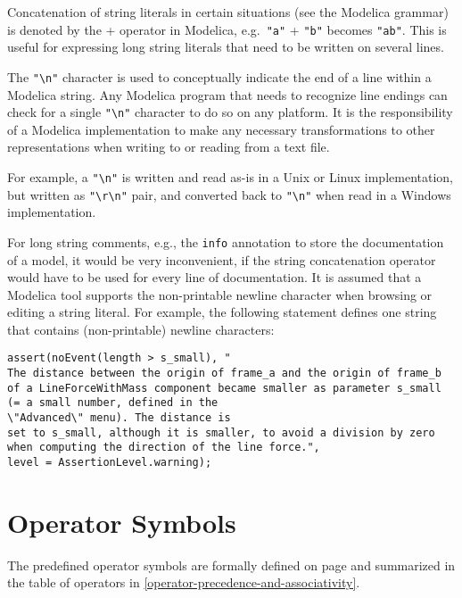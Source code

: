 Concatenation of string literals in certain situations (see the Modelica
grammar) is denoted by the + operator in Modelica, e.g.\ \lstinline!"a"! + \lstinline!"b"!
becomes \lstinline!"ab"!. This is useful for expressing long string literals that
need to be written on several lines.

The \lstinline!"\n"! character is used to conceptually indicate the
end of a line within a Modelica string. Any Modelica program that needs
to recognize line endings can check for a single \lstinline!"\n"!
character to do so on any platform. It is the responsibility of a
Modelica implementation to make any necessary transformations to other
representations when writing to or reading from a text file.

\begin{nonnormative}
For example, a \lstinline!"\n"! is written and read as-is in a Unix or Linux implementation, but written as
\lstinline!"\r\n"! pair, and converted back to \lstinline!"\n"! when read in a Windows implementation.
\end{nonnormative}

\begin{nonnormative}
For long string comments, e.g., the \lstinline!info! annotation to
store the documentation of a model, it would be very inconvenient, if
the string concatenation operator would have to be used for every line
of documentation. It is assumed that a Modelica tool supports the
non-printable newline character when browsing or editing a string
literal. For example, the following statement defines one string that
contains (non-printable) newline characters:
\begin{lstlisting}[language=modelica]
assert(noEvent(length > s_small), "
The distance between the origin of frame_a and the origin of frame_b
of a LineForceWithMass component became smaller as parameter s_small
(= a small number, defined in the
\"Advanced\" menu). The distance is
set to s_small, although it is smaller, to avoid a division by zero
when computing the direction of the line force.",
level = AssertionLevel.warning);
\end{lstlisting}
\end{nonnormative}

\section{Operator Symbols}

The predefined operator symbols are formally defined on page \pageref{lexical-conventions} and
summarized in the table of operators in \autoref{operator-precedence-and-associativity}.
